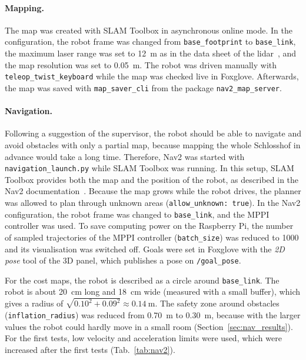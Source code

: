 \paragraph{Mapping.} The map was created with SLAM Toolbox in asynchronous online mode. In the configuration, the robot frame was changed from \texttt{base\_footprint} to \texttt{base\_link}, the maximum laser range was set to \SI{12}{\metre} as in the data sheet of the lidar~\citep{slamtec_a2m12}, and the map resolution was set to \SI{0.05}{\metre}. The robot was driven manually with \texttt{teleop\_twist\_keyboard} while the map was checked live in Foxglove. Afterwards, the map was saved with \texttt{map\_saver\_cli} from the package \texttt{nav2\_map\_server}.

\paragraph{Navigation.} Following a suggestion of the supervisor, the robot should be able to navigate and avoid obstacles with only a partial map, because mapping the whole Schlosshof in advance would take a long time. Therefore, Nav2 was started with \texttt{navigation\_launch.py} while SLAM Toolbox was running. In this setup, SLAM Toolbox provides both the map and the position of the robot, as described in the Nav2 documentation~\citep{nav2_slam}. Because the map grows while the robot drives, the planner was allowed to plan through unknown areas (\texttt{allow\_unknown: true}). In the Nav2 configuration, the robot frame was changed to \texttt{base\_link}, and the MPPI controller was used. To save computing power on the Raspberry Pi, the number of sampled trajectories of the MPPI controller (\texttt{batch\_size}) was reduced to 1000 and its visualisation was switched off. Goals were set in Foxglove with the \emph{2D pose} tool of the 3D panel, which publishes a pose on \texttt{/goal\_pose}.

For the cost maps, the robot is described as a circle around \texttt{base\_link}. The robot is about \SI{20}{\centi\metre} long and \SI{18}{\centi\metre} wide (measured with a small buffer), which gives a radius of $\sqrt{0.10^2 + 0.09^2} \approx \SI{0.14}{\metre}$. The safety zone around obstacles (\texttt{inflation\_radius}) was reduced from \SI{0.70}{\metre} to \SI{0.30}{\metre}, because with the larger values the robot could hardly move in a small room (Section~\ref{sec:nav_results}). For the first tests, low velocity and acceleration limits were used, which were increased after the first tests (Tab.~\ref{tab:nav2}).

